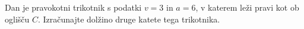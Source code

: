 \documentclass[addpoints]{exam}
\begin{document}
\begin{questions}




    \question[4]
    Dan je pravokotni trikotnik s podatki $v=3$ in $a=6$, v katerem leži pravi kot ob oglišču $C$. 
    Izračunajte dolžino druge katete tega trikotnika.
    

        






\end{questions}
\end{document}
